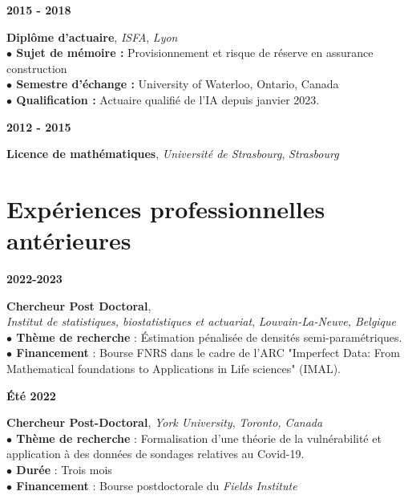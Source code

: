 \documentclass[a4paper,11pt]{article} %
\newcommand{\tabcv}[2]{
\begin{minipage}[t]{0.12\linewidth}
\textbf{\footnotesize #1}
\end{minipage}\hfill
\begin{minipage}[t]{0.85\linewidth}
#2
\end{minipage}
\vspace{1em}
}
\begin{document}
\begin{flushleft}
\tabcv{2015 - 2018}{
\textbf{Diplôme d'actuaire}, \textit{ISFA}, \textit{Lyon}\\[0.5em]
{\footnotesize \textbf{$\bullet$ Sujet de mémoire :} Provisionnement et risque de réserve en assurance construction\\
\footnotesize \textbf{$\bullet$ Semestre d'échange :} University of Waterloo, Ontario, Canada\\
\footnotesize \textbf{$\bullet$ Qualification :} Actuaire qualifié de l'IA depuis janvier 2023. 
}
}

\tabcv{2012 - 2015}{
\textbf{Licence de mathématiques}, \textit{Université de Strasbourg}, \textit{Strasbourg}\\[0.5em]
}

\clearpage
\section{Expériences professionnelles antérieures}



\tabcv{2022-2023}{
\textbf{Chercheur Post Doctoral}, \\ \textit{Institut de statistiques, biostatistiques et actuariat}, \textit{Louvain-La-Neuve, Belgique}\\[0.5em]
{\footnotesize
\textbf{$\bullet$ Thème de recherche} : \'Estimation pénalisée de densités semi-paramétriques.\\
\textbf{$\bullet$ Financement} : Bourse FNRS dans le cadre de l'ARC "Imperfect Data:
From Mathematical foundations to Applications in Life sciences" (IMAL).\\
}
}


\tabcv{\'Eté 2022}{
\textbf{Chercheur Post-Doctoral}, \textit{York University}, \textit{Toronto, Canada}\\[0.5em]
{\footnotesize
\textbf{$\bullet$ Thème de recherche} : Formalisation d'une théorie de la vulnérabilité et application à des données de sondages relatives au Covid-19. \\
\textbf{$\bullet$ Durée} : Trois mois\\
\textbf{$\bullet$ Financement} : Bourse postdoctorale du \textit{Fields Institute}\\
}
}



\end{flushleft}
\end{document}
